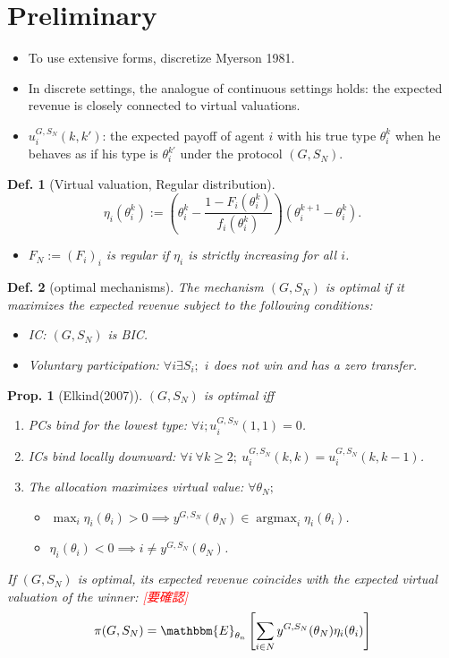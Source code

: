 \documentclass[11pt,a4paper,dvipdfmx]{article}
\theoremstyle{plain}
\newtheorem{prop}{Prop.}[section]
\newtheorem{df}{Def.}[section]
\newcommand{\E}{\mathbbm{E}}
\newcommand{\1}{\mathbbm{1}}
\DeclareMathOperator*{\argmax}{argmax}
\newcommand{\ocomment}[1]{{\textcolor{red}{#1}}}
\begin{document}
\newpage
\section{Preliminary}
\begin{itemize}
	\item To use extensive forms, discretize Myerson 1981.
	\item In discrete settings, the analogue of continuous settings holds: the expected revenue is closely connected to virtual valuations.
	\item $u_i^{G, S_N}(k, k')$: the expected payoff of agent $i$ with his true type $\theta_i^k$ when he behaves as if his type is $\theta_i^{k'}$ under the protocol $(G, S_N)$.
\end{itemize}
\begin{df}[Virtual valuation, Regular distribution]
	\[
	\eta_i(\theta_i^k) := \left( \theta_i^k - \frac{1 - F_i(\theta_i^k)}{f_i(\theta_i^k)}\right)(\theta_i^{k+1} - \theta_i^k).
	\]
	\begin{itemize}
		\item $F_N := (F_i)_i$ is regular if $\eta_i$ is strictly increasing for all $i$. 
	\end{itemize}
\end{df}
\begin{df}[optimal mechanisms]
	The mechanism $(G, S_N)$ is optimal if it maximizes the expected revenue subject to the following conditions:
	\begin{itemize}
		\item IC: $(G, S_N)$ is BIC.
		\item Voluntary participation: $\forall i \exists S_i;$ $i$ does not win and has a zero transfer.
	\end{itemize}
\end{df}
\begin{prop}[Elkind(2007)] \label{optimal}
	$(G, S_N)$ is optimal iff
	\begin{enumerate}
		\item PCs bind for the lowest type: $\forall i; u_i^{G, S_N}(1, 1) = 0$.
		\item ICs bind locally downward: $\forall i \ \forall k \geq 2; \ u_i^{G, S_N}(k, k) = u_i^{G, S_N}(k, k-1)$.
		\item The allocation maximizes virtual value: $\forall \theta_N;$
		\begin{itemize}
			\item $\max_i \eta_i(\theta_i) > 0 \implies y^{G, S_N}(\theta_N) \in \argmax_i \eta_i(\theta_i)$.
			\item $\eta_i(\theta_i) < 0 \implies i \neq y^{G, S_N}(\theta_N)$.
		\end{itemize}
	\end{enumerate}
	
	If $(G, S_N)$ is optimal, its expected revenue coincides with the expected virtual valuation of the winner: \ocomment{[要確認]}
	\[
	\pi(G, S_N) = \E_{\theta_n} \left[ \sum_{i \in N} y^{G, S_N}(\theta_N) \eta_i(\theta_i) \right]
	\]
\end{prop}
\end{document}
